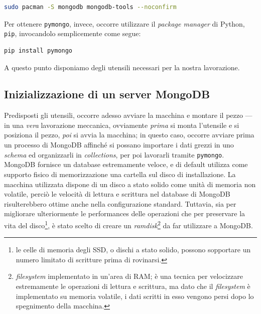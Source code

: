 		\begin{lstlisting}[language=bash,caption={installazione di MongoDB}]
			sudo pacman -S mongodb mongodb-tools --noconfirm
		\end{lstlisting}

		\vspace{0.3cm}

		Per ottenere \texttt{pymongo}, invece, occorre utilizzare il \textit{package manager} di Python, \texttt{pip}, invocandolo semplicemente come segue:

		\begin{lstlisting}[language=bash,caption={installazione di pymongo}]
			pip install pymongo
		\end{lstlisting}

		\vspace{0.3cm}

		A questo punto disponiamo degli utensili necessari per la nostra lavorazione.

	\subsection{Inizializzazione di un server MongoDB}

		Predisposti gli utensili, occorre adesso avviare la macchina e montare il pezzo --- in una \textit{vera} lavorazione meccanica, ovviamente \textit{prima} si monta l'utensile e si posiziona il pezzo, \textit{poi} si avvia la macchina; in questo caso, occorre avviare prima un processo di MongoDB affinché si possano importare i dati grezzi in uno \textit{schema} ed organizzarli in \textit{collections}, per poi lavorarli tramite \texttt{pymongo}. \\

	MongoDB fornisce un database estremamente veloce, e di default utilizza come supporto fisico di memorizzazione una cartella sul disco di installazione. La macchina utilizzata dispone di un disco a stato solido come unità di memoria non volatile, perciò le velocità di lettura e scrittura nel database di MongoDB risulterebbero ottime anche nella configurazione standard. Tuttavia, sia per migliorare ulteriormente le performances delle operazioni che per preservare la vita del disco\footnote{le celle di memoria degli SSD, o dischi a stato solido, possono sopportare un numero limitato di scritture prima di rovinarsi.}, è stato scelto di creare un \textit{ramdisk}\footnote{\textit{filesystem} implementato in un'area di RAM; è una tecnica per velocizzare estremamente le operazioni di lettura e scrittura, ma dato che il \textit{filesystem} è implementato su memoria volatile, i dati scritti in esso vengono persi dopo lo spegnimento della macchina.} da far utilizzare a MongoDB. \\

